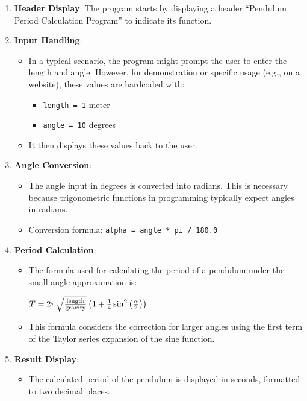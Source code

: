 \begin{enumerate}
\item \textbf{Header Display}: The program starts by displaying a header ``Pendulum Period Calculation Program'' to indicate its function.
\item \textbf{Input Handling}:

\begin{itemize}
\item In a typical scenario, the program might prompt the user to enter the length and angle. However, for demonstration or specific usage (e.g., on a website), these values are hardcoded with:

\begin{itemize}
\item \texttt{length = 1} meter
\item \texttt{angle = 10} degrees
\end{itemize}


\item It then displays these values back to the user.
\end{itemize}


\item \textbf{Angle Conversion}:

\begin{itemize}
\item The angle input in degrees is converted into radians. This is necessary because trigonometric functions in programming typically expect angles in radians.
\item Conversion formula: \texttt{alpha = angle * pi / 180.0}
\end{itemize}


\item \textbf{Period Calculation}:

\begin{itemize}
\item The formula used for calculating the period of a pendulum under the small-angle approximation is:

$\Large T = 2\pi \sqrt{\frac{\text{length}}{\text{gravity}}} \left(1 + \frac{1}{4} \sin^2\left(\frac{\alpha}{2}\right)\right)$


\item This formula considers the correction for larger angles using the first term of the Taylor series expansion of the sine function.
\end{itemize}


\item \textbf{Result Display}:

\begin{itemize}
\item The calculated period of the pendulum is displayed in seconds, formatted to two decimal places.
\end{itemize}
\end{enumerate}


